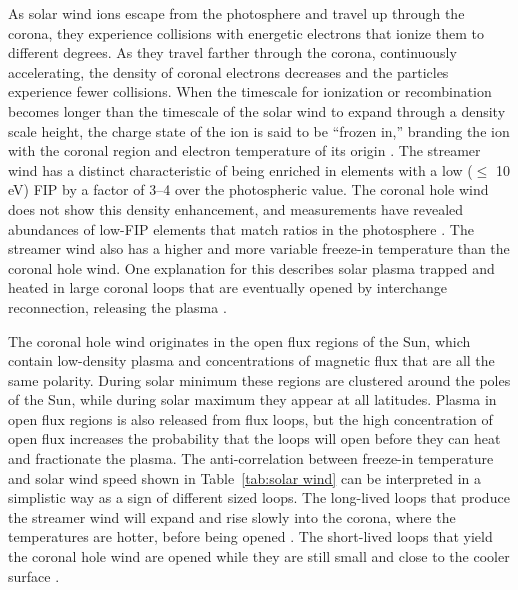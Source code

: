 As solar wind ions escape from the photosphere and travel up through the corona, they experience collisions with energetic electrons that ionize them to different degrees. As they travel farther through the corona, continuously accelerating, the density of coronal electrons decreases and the particles experience fewer collisions. When the timescale for ionization or recombination becomes longer than the timescale of the solar wind to expand through a density scale height, the charge state of the ion is said to be ``frozen in,'' branding the ion with the coronal region and electron temperature of its origin \citep{hundhausen68}. The streamer wind has a distinct characteristic of being enriched in elements with a low ($\le$ 10 eV) \ac{FIP} by a factor of 3--4 over the photospheric value. The coronal hole wind does not show this density enhancement, and measurements have revealed abundances of low-\ac{FIP} elements that match ratios in the photosphere \citep{vonsteiger93}. The streamer wind also has a higher and more variable freeze-in temperature than the coronal hole wind. One explanation for this describes solar plasma trapped and heated in large coronal loops that are eventually opened by interchange reconnection, releasing the plasma \citep{gosling95, fisk98, fisk99a}.

The coronal hole wind originates in the open flux regions of the Sun, which contain low-density plasma and concentrations of magnetic flux that are all the same polarity. During solar minimum these regions are clustered around the poles of the Sun, while during solar maximum they appear at all latitudes. Plasma in open flux regions is also released from flux loops, but the high concentration of open flux increases the probability that the loops will open before they can heat and fractionate the plasma. The anti-correlation between freeze-in temperature and solar wind speed shown in Table~\ref{tab:solar wind} can be interpreted in a simplistic way as a sign of different sized loops. The long-lived loops that produce the streamer wind will expand and rise slowly into the corona, where the temperatures are hotter, before being opened \citep{fisk98, fisk01a}. The short-lived loops that yield the coronal hole wind are opened while they are still small and close to the cooler surface \citep{fisk99a, fisk03, wimmer03b}.
